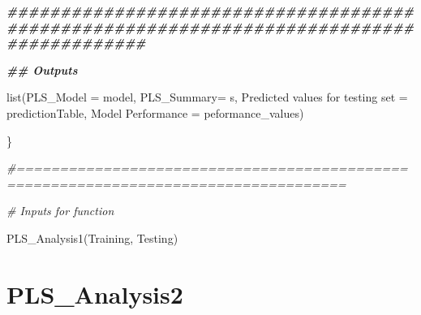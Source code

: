 \documentclass[
]{article}
\newenvironment{Shaded}{\begin{snugshade}}{\end{snugshade}}
\newcommand{\AttributeTok}[1]{\textcolor[rgb]{0.77,0.63,0.00}{#1}}
\newcommand{\CommentTok}[1]{\textcolor[rgb]{0.56,0.35,0.01}{\textit{#1}}}
\newcommand{\DocumentationTok}[1]{\textcolor[rgb]{0.56,0.35,0.01}{\textbf{\textit{#1}}}}
\newcommand{\FunctionTok}[1]{\textcolor[rgb]{0.00,0.00,0.00}{#1}}
\newcommand{\NormalTok}[1]{#1}
\newcommand{\OtherTok}[1]{\textcolor[rgb]{0.56,0.35,0.01}{#1}}
\newcommand{\StringTok}[1]{\textcolor[rgb]{0.31,0.60,0.02}{#1}}
\begin{document}
\begin{Shaded}
\begin{Highlighting}[]
  \DocumentationTok{\#\#\#\#\#\#\#\#\#\#\#\#\#\#\#\#\#\#\#\#\#\#\#\#\#\#\#\#\#\#\#\#\#\#\#\#\#\#\#\#\#\#\#\#\#\#\#\#\#\#\#\#\#\#\#\#\#\#\#\#\#\#\#\#\#\#\#\#\#\#\#\#\#\#\#\#\#\#\#\#\#\#\#\#\#\#\#\#\#}
  
  \DocumentationTok{\#\# Outputs}
  
  \FunctionTok{list}\NormalTok{(}\AttributeTok{PLS\_Model =}\NormalTok{ model, }\StringTok{\textasciigrave{}}\AttributeTok{PLS\_Summary}\StringTok{\textasciigrave{}}\OtherTok{=}\NormalTok{ s, }\StringTok{\textasciigrave{}}\AttributeTok{Predicted values for testing set}\StringTok{\textasciigrave{}} \OtherTok{=}\NormalTok{ predictionTable, }
       \StringTok{\textasciigrave{}}\AttributeTok{Model Performance}\StringTok{\textasciigrave{}} \OtherTok{=}\NormalTok{ peformance\_values)}
  
  
\NormalTok{\}}

\CommentTok{\#====================================================================================}

\CommentTok{\# Inputs for function}

\FunctionTok{PLS\_Analysis1}\NormalTok{(Training, Testing)}
\end{Highlighting}
\end{Shaded}

\hypertarget{pls_analysis2}{%
\section{PLS\_Analysis2}\label{pls_analysis2}}
\end{document}
